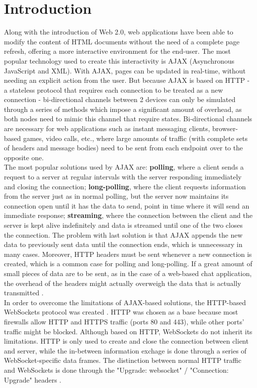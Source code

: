 \documentclass[conference]{IEEEtran}
\begin{document}
\section{Introduction}
Along with the introduction of Web 2.0, web applications have been able to
modify the content of HTML documents without the need of a complete page
refresh, offering a more interactive environment for the end-user.
The most popular technology used to create this interactivity is AJAX \cite{AJAX}
(Asynchronous JavaScript and XML). With AJAX, pages can be updated in real-time,
without needing an explicit action from the user. But because AJAX is based on
HTTP - a stateless protocol that requires each connection to be treated as a new
connection - bi-directional channels between 2 devices can only be simulated
through a series of methods which impose a significant amount of overhead, as both
nodes need to mimic this channel that require states.
Bi-directional channels are necessary for web applications such as instant
messaging clients, browser-based games, video calls, etc., where large amounts
of traffic (with complete sets of headers and message bodies) need to be sent from
each endpoint over to the opposite one.
\\

The most popular solutions used by AJAX are: \textbf{polling}, where a client sends
a request to a server at regular intervals with the server responding immediately
and closing the connection; \textbf{long-polling}, where the client requests
information from the server just as in normal polling, but the server now maintains
its connection open until it has the data to send, point in time where
it will send an immediate response;
\textbf{streaming}, where the connection between the client and the server is
kept alive indefinitely and data is streamed until one of the two closes the
connection. The problem with last solution is that AJAX
appends the new data to previously sent data until the connection ends, which is
unnecessary in many cases. Moreover, HTTP headers must be sent whenever a new
connection is created, which is a common case for polling and long-polling. If
a great amount of small pieces of data are to be sent, as in the case of a
web-based chat application, the overhead of the headers might actually overweigh
the data that is actually transmitted \cite{2009:Misc}.
\\

In order to overcome the limitations of AJAX-based solutions, the HTTP-based
WebSockets protocol was created \cite{RFC}. HTTP was chosen as a base because
most firewalls allow HTTP and HTTPS traffic  (ports 80 and 443), while other
ports' traffic might be blocked. Although based on HTTP, WebSockets do not
inherit its limitations. HTTP is only used to create and close the connection
between client and server, while the in-between information exchage is done
through a series of WebSocket-specific data frames. The distinction between
normal HTTP traffic and WebSockets is done through the "Upgrade: websocket" /
"Connection: Upgrade" headers \cite{RFC}.
\\
\end{document}
